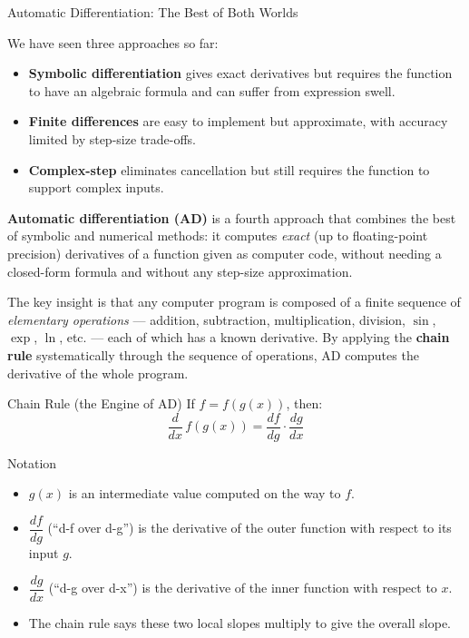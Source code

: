 \documentclass[aspectratio=169,10pt]{beamer}
\begin{document}
\begin{frame}[allowframebreaks]{Automatic Differentiation: The Best of Both Worlds}

  We have seen three approaches so far:
  \begin{itemize}
    \item \textbf{Symbolic differentiation} gives exact derivatives but
          requires the function to have an algebraic formula and can suffer
          from expression swell.
    \item \textbf{Finite differences} are easy to implement but approximate,
          with accuracy limited by step-size trade-offs.
    \item \textbf{Complex-step} eliminates cancellation but still requires
          the function to support complex inputs.
  \end{itemize}

  \textbf{Automatic differentiation (AD)} is a fourth approach that combines
  the best of symbolic and numerical methods: it computes \emph{exact}
  (up to floating-point precision) derivatives of a function given as
  computer code, without needing a closed-form formula and without any
  step-size approximation.

  \medskip
  The key insight is that any computer program is composed of a finite
  sequence of \emph{elementary operations} --- addition, subtraction,
  multiplication, division, $\sin$, $\exp$, $\ln$, etc. --- each of which
  has a known derivative.  By applying the \textbf{chain rule}
  systematically through the sequence of operations, AD computes the
  derivative of the whole program.

  \begin{block}{Chain Rule (the Engine of AD)}
    If $f = f(g(x))$, then:
    \[
      \frac{d}{dx}\,f(g(x))
      = \frac{df}{dg} \cdot \frac{dg}{dx}
    \]
  \end{block}

  \begin{block}{Notation}
    \begin{itemize}
      \item $g(x)$ is an intermediate value computed on the way to $f$.
      \item $\dfrac{df}{dg}$ (``d-f over d-g'') is the derivative of the
            outer function with respect to its input $g$.
      \item $\dfrac{dg}{dx}$ (``d-g over d-x'') is the derivative of the
            inner function with respect to $x$.
      \item The chain rule says these two local slopes multiply to give
            the overall slope.
    \end{itemize}
  \end{block}


\end{frame}
\end{document}
